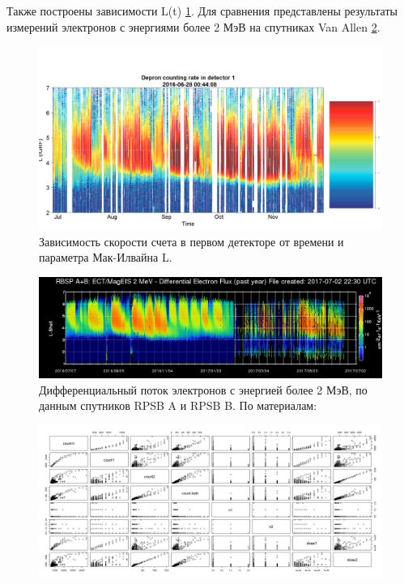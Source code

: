 



Также построены зависимости L(t) \ref{fig:l-t2016}. Для сравнения представлены результаты измерений электронов с энергиями более 2 МэВ на спутниках Van Allen \ref{fig:van-allen-lshell-crop}. 
\begin{figure}
	\centering
	\includegraphics[width=0.9\linewidth]{images/L-t2016}
	\caption{Зависимость скорости счета в первом детекторе от времени и параметра Мак-Илвайна L.}
	\label{fig:l-t2016}
\end{figure}
\begin{figure}
	\centering		\includegraphics[width=0.7\linewidth]{../literature_repository/relelec/van-allen-lshell-crop}
	\caption{Дифференциальный поток электронов с энергией более 2 МэВ, по данным спутников RPSB A и RPSB B. По материалам: \cite{NOAA}}
	\label{fig:van-allen-lshell-crop}
\end{figure}



\begin{figure}
	\centering
	\includegraphics[width=0.7\linewidth]{images/Flash/Rplot06}
	\caption{}
	\label{fig:rplot06}
\end{figure}


